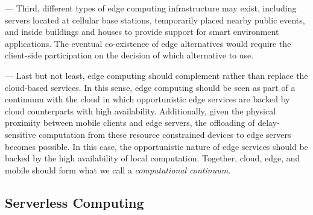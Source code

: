 
--- Third, different types of edge computing infrastructure may exist, including servers located at cellular base stations, temporarily placed nearby public events, and inside buildings and houses to provide support for smart environment applications. The eventual co-existence of edge alternatives would require the client-side participation on the decision of which alternative to use.

--- Last but not least, edge computing should complement rather than replace the cloud-based services. In this sense, edge computing should be seen as part of a continuum with the cloud in which opportunistic edge services are backed by cloud counterparts with high availability. Additionally, given the physical proximity between mobile clients and edge servers, the offloading of delay-sensitive computation from these resource constrained devices to edge servers becomes possible. In this case, the opportunistic nature of edge services should be backed by the high availability of local computation. Together, cloud, edge, and mobile should form what we call a \textit{computational continuum}.




\subsection{Serverless Computing}

